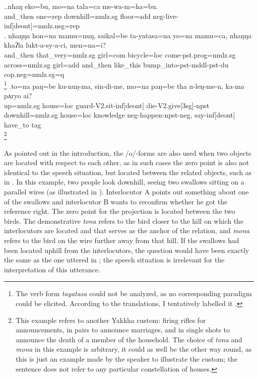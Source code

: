 \ex.\ag.\label{mewamhabu}nhaŋ eko=bu,    mo=na tala=ca         me-wa-m=ha=bu.\\
and\_then one{\sc =rep} downhill{\sc =nmlz.sg} floor{\sc =add} {\sc neg-}live{\sc -inf[deont]=nmlz.nsg=rep} \\
 
\bg. nhaŋŋa hon=na mamu=nuŋ, saikal=be ta-yatasa=na yo=na mamu=ca, nhaŋŋa khaʔla lukt-a-sy-a-ci,  men=na=i?\\
	and\_then that\_very{\sc =nmlz.sg} girl{\sc =com} bicycle{\sc =loc} come{\sc [3sg]-pst.prog=nmlz.sg} across{\sc =nmlz.sg} girl{\sc =add} and\_then like\_this bump\_into{\sc -pst-mddl-pst-du} {\sc cop.neg=nmlz.sg=q}\\
\footnote{The verb form \emph{tayatasa} could not be analyzed, as no corresponding paradigm could be elicited. According to the  translations, I tentatively labelled it .} 
\bg.to=na  paŋ=be     ku-nuŋ-ma, sin-di-me,  mo=na  paŋ=be     tha  n-leŋ-me-n, ka-ma pʌryo  ai?\\
up{\sc =nmlz.sg} house{\sc =loc} guard{\sc -V2.sit-inf[deont]} die{\sc -V2.give[3sg]-npst} downhill{\sc =nmlz.sg} house{\sc =loc} knowledge {\sc neg-}happen{\sc [3sg]-npst-neg}, say{\sc -inf[deont]} have\_to {\sc tag}\\
\footnote{This example refers to another Yakkha custom: firing rifles for announcements, in pairs to announce marriages, and in single shots to announce the death of a  member of the household. The choice of \emph{tona} and \emph{mona} in this example is arbitrary, it could as well be the other way round, as this is just an example made by the speaker to illustrate the custom; the sentence does not refer to any particular constellation of houses.} 	 
   			
			
As pointed out in the introduction, the /o/-forms are also used when two objects are located with respect to each other, as in such cases the zero point is also not identical to the speech situation, but located between the related objects, such as in \Next. In this example, two people look downhill, seeing two swallows  sitting on a parallel wires (as illustrated in ). Interlocutor A points out something about one of the  swallows and interlocutor B wants to reconfirm whether he got the reference right. The  zero point for the projection is located between the two birds. The demonstrative \emph{tona} refers to the bird closer to the hill on which the interlocutors are located and that serves as the anchor of the relation, and \emph{mona} refers to the bird on the wire  further away from that hill. If the swallows had been located uphill from the interlocutors, the question would have been exactly the same as the one uttered in \Next; the speech situation is irrelevant for the interpretation of this utterance.

